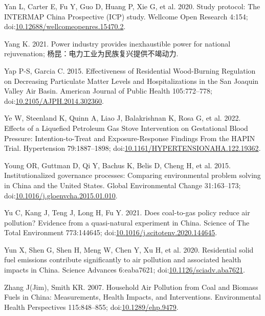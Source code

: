 \documentclass[
  letterpaper,
  DIV=11,
  numbers=noendperiod]{scrartcl}
\newlength{\cslhangindent}
\newlength{\cslentryspacingunit} %
\newenvironment{CSLReferences}[2] %
 {%
  \setlength{\parindent}{0pt}
  \ifodd #1
  \let\oldpar\par
  \def\par{\hangindent=\cslhangindent\oldpar}
  \fi
  \setlength{\parskip}{#2\cslentryspacingunit}
 }%
 {}
\begin{document}
\begin{CSLReferences}{1}{0}
\leavevmode{}%
Yan L, Carter E, Fu Y, Guo D, Huang P, Xie G, et al. 2020. Study
protocol: {The INTERMAP China Prospective} ({ICP}) study. Wellcome Open
Research 4:154;
doi:\href{https://doi.org/10.12688/wellcomeopenres.15470.2}{10.12688/wellcomeopenres.15470.2}.

\leavevmode{}%
Yang K. 2021. Power industry provides inexhaustible power for national
rejuvenation; 杨昆：电力工业为民族复兴提供不竭动力.

\leavevmode{}%
Yap P-S, Garcia C. 2015. Effectiveness of {Residential Wood-Burning
Regulation} on {Decreasing Particulate Matter Levels} and
{Hospitalizations} in the {San Joaquin Valley Air Basin}. American
Journal of Public Health 105:772--778;
doi:\href{https://doi.org/10.2105/AJPH.2014.302360}{10.2105/AJPH.2014.302360}.

\leavevmode{}%
Ye W, Steenland K, Quinn A, Liao J, Balakrishnan K, Rosa G, et al. 2022.
Effects of a {Liquefied Petroleum Gas Stove Intervention} on
{Gestational Blood Pressure}: {Intention-to-Treat} and
{Exposure-Response Findings From} the {HAPIN Trial}. Hypertension
79:1887--1898;
doi:\href{https://doi.org/10.1161/HYPERTENSIONAHA.122.19362}{10.1161/HYPERTENSIONAHA.122.19362}.

\leavevmode{}%
Young OR, Guttman D, Qi Y, Bachus K, Belis D, Cheng H, et al. 2015.
Institutionalized governance processes: {Comparing} environmental
problem solving in {China} and the {United States}. Global Environmental
Change 31:163--173;
doi:\href{https://doi.org/10.1016/j.gloenvcha.2015.01.010}{10.1016/j.gloenvcha.2015.01.010}.

\leavevmode{}%
Yu C, Kang J, Teng J, Long H, Fu Y. 2021. Does coal-to-gas policy reduce
air pollution? {Evidence} from a quasi-natural experiment in {China}.
Science of The Total Environment 773:144645;
doi:\href{https://doi.org/10.1016/j.scitotenv.2020.144645}{10.1016/j.scitotenv.2020.144645}.

\leavevmode{}%
Yun X, Shen G, Shen H, Meng W, Chen Y, Xu H, et al. 2020. Residential
solid fuel emissions contribute significantly to air pollution and
associated health impacts in {China}. Science Advances 6:eaba7621;
doi:\href{https://doi.org/10.1126/sciadv.aba7621}{10.1126/sciadv.aba7621}.

\leavevmode{}%
Zhang J(Jim), Smith KR. 2007. Household {Air Pollution} from {Coal} and
{Biomass Fuels} in {China}: {Measurements}, {Health Impacts}, and
{Interventions}. Environmental Health Perspectives 115:848--855;
doi:\href{https://doi.org/10.1289/ehp.9479}{10.1289/ehp.9479}.


\end{CSLReferences}
\end{document}

